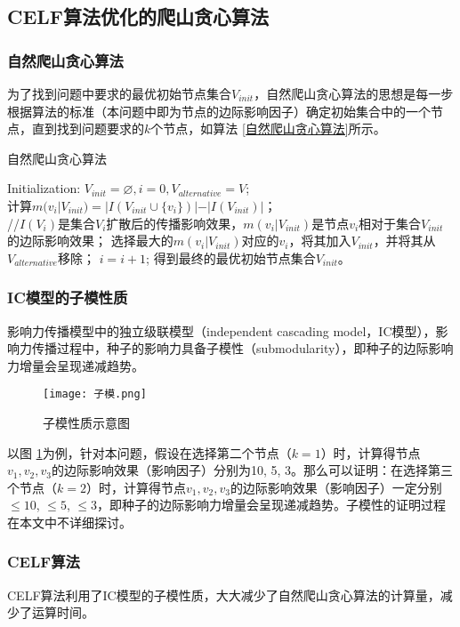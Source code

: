 \documentclass[UTF8]{ctexart}
\newcommand{\upcite}[1]{\textsuperscript{\textsuperscript{\cite{#1}}}}
\begin{document}
\subsection{CELF算法优化的爬山贪心算法}
\subsubsection{自然爬山贪心算法}
为了找到问题中要求的最优初始节点集合$V_{init}$，自然爬山贪心算法的思想是每一步根据算法的标准（本问题中即为节点的边际影响因子）确定初始集合中的一个节点，直到找到问题要求的$k$个节点，如算法 \ref{自然爬山贪心算法}所示。
\begin{algorithm}[h!]
	\caption{自然爬山贪心算法}
	\label{自然爬山贪心算法}	
	Initialization: $V_{init}=\varnothing , i=0, V_{alternative}=V $;\\
	{
		{
			计算$m(v_i|V_{init})=|I(V_{init}\cup \{v_i\})|-|I(V_{init})|$；\\
			//$I(V_{i})$是集合$V_{i}$扩散后的传播影响效果，$m(v_i|V_{init})$是节点$v_i$相对于集合$V_{init}$的边际影响效果；
		}
		选择最大的$m(v_i|V_{init})$对应的$v_i$，将其加入$V_{init}$，并将其从$V_{alternative}$移除；
		$i=i+1$;
	}
	得到最终的最优初始节点集合$V_{init}$。
\end{algorithm}

\subsubsection{IC模型的子模性质}
影响力传播模型中的独立级联模型（independent cascading model，IC模型），影响力传播过程中，种子的影响力具备子模性（submodularity），即种子的边际影响力增量会呈现递减趋势\upcite{云南大学}。

\begin{figure}[h!]
	\centering
	\texttt{[image: 子模.png]}
	\caption{子模性质示意图}
	\label{子模}
\end{figure}

以图 \ref{子模}为例，针对本问题，假设在选择第二个节点（$k=1$）时，计算得节点$v_1, v_2, v_3$的边际影响效果（影响因子）分别为10, 5, 3。那么可以证明：在选择第三个节点（$k=2$）时，计算得节点$v_1, v_2, v_3$的边际影响效果（影响因子）一定分别$\leqslant10$, $\leqslant5$, $\leqslant3$，即种子的边际影响力增量会呈现递减趋势。子模性的证明过程在本文中不详细探讨。

\subsubsection{CELF算法}
CELF算法利用了IC模型的子模性质，大大减少了自然爬山贪心算法的计算量，减少了运算时间。
\end{document}

